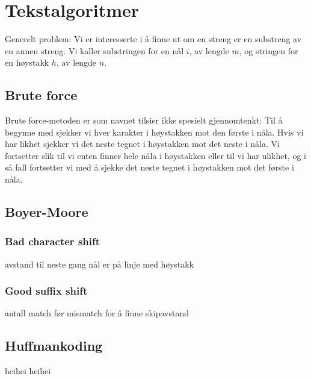 \section{\color{red}Tekstalgoritmer}
	Generelt problem: Vi er interesserte i å finne ut om en streng er en substreng av en annen streng. Vi kaller substringen for en nål $i$, av lengde $m$, og stringen for en høystakk $h$, av lengde $n$.

\subsection{\color{red}Brute force}
Brute force-metoden er som navnet tilsier ikke spesielt gjennomtenkt: Til å begynne med sjekker vi hver karakter i høystakken mot den første i nåla. Hvis vi har likhet sjekker vi det neste tegnet i høystakken mot det neste i nåla. Vi fortsetter slik til vi enten finner hele nåla i høystakken eller til vi har ulikhet, og i så fall fortsetter vi med å sjekke det neste tegnet i høystakken mot det første i nåla.

\subsection{\color{red}Boyer-Moore}

\subsubsection{\color{red}Bad character shift}
avstand til neste gang nål er på linje med høystakk
\subsubsection{\color{red}Good suffix shift}
antall match før mismatch for å finne skipavstand
\subsection{\color{red}Huffmankoding}
heihei
heihei
\label{huffman}